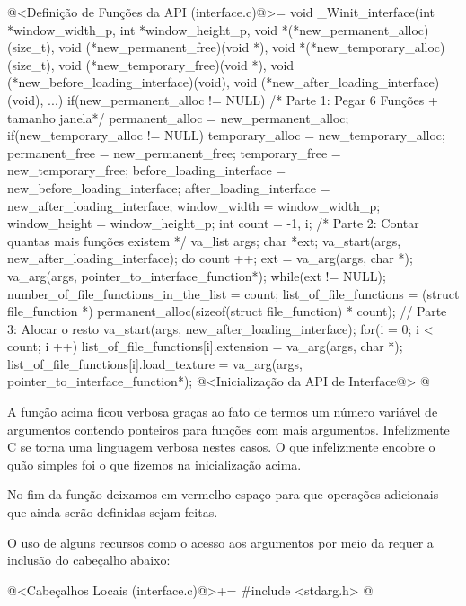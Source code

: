 \iniciocodigo
@<Definição de Funções da API (interface.c)@>=
void _Winit_interface(int *window_width_p, int *window_height_p,
                      void *(*new_permanent_alloc)(size_t),
                      void (*new_permanent_free)(void *),
                      void *(*new_temporary_alloc)(size_t),
                      void (*new_temporary_free)(void *),
                      void (*new_before_loading_interface)(void),
                      void (*new_after_loading_interface)(void), ...){
  if(new_permanent_alloc != NULL) /* Parte 1: Pegar 6 Funções + tamanho janela*/
    permanent_alloc = new_permanent_alloc;
  if(new_temporary_alloc != NULL)
    temporary_alloc = new_temporary_alloc;
  permanent_free = new_permanent_free;
  temporary_free = new_temporary_free;
  before_loading_interface = new_before_loading_interface;
  after_loading_interface = new_after_loading_interface;
  window_width = window_width_p;
  window_height = window_height_p;
  {
    int count = -1, i; /* Parte 2: Contar quantas mais funções existem */
    va_list args;
    char *ext;
    va_start(args, new_after_loading_interface);
    do{
      count ++;
      ext = va_arg(args, char *);
      va_arg(args, pointer_to_interface_function*);
    } while(ext != NULL);
    number_of_file_functions_in_the_list = count;
    list_of_file_functions = (struct file_function *)
                               permanent_alloc(sizeof(struct file_function) * 
                                               count); // Parte 3: Alocar o resto
    va_start(args, new_after_loading_interface);
    for(i = 0; i < count; i ++){
      list_of_file_functions[i].extension = va_arg(args, char *);
      list_of_file_functions[i].load_texture =
                          va_arg(args, pointer_to_interface_function*);
    }
  }
  @<Inicialização da API de Interface@>
}
@
\fimcodigo

A função acima ficou verbosa graças ao fato de termos um número
variável de argumentos contendo ponteiros para funções com mais
argumentos. Infelizmente C se torna uma linguagem verbosa nestes
casos. O que infelizmente encobre o quão simples foi o que fizemos na
inicialização acima.

No fim da função deixamos em vermelho espaço para que operações
adicionais que ainda serão definidas sejam feitas.

O uso de alguns recursos como o acesso aos argumentos por meio da
 requer a inclusão do cabeçalho abaixo:

\iniciocodigo
@<Cabeçalhos Locais (interface.c)@>+=
#include <stdarg.h>
@
\fimcodigo

